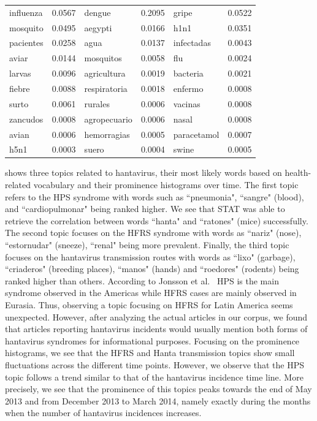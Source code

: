 \documentclass[conference]{IEEEtran}
\newcommand{\model}{{STAT}\xspace} %
\begin{document}
\begin{table}[t]
\begin{center}
\begin{tabular}{|lr|lr|lr|}
influenza & 0.0567 & dengue & 0.2095 & gripe & 0.0522 \\
mosquito & 0.0495 & aegypti & 0.0166 & h1n1 & 0.0351 \\
pacientes & 0.0258 & agua & 0.0137  & infectadas &0.0043 \\
aviar & 0.0144 & mosquitos & 0.0058  & flu & 0.0024\\
larvas & 0.0096 & agricultura & 0.0019 & bacteria & 0.0021 \\
fiebre & 0.0088 & respiratoria & 0.0018 & enfermo & 0.0008 \\
surto & 0.0061 & rurales & 0.0006 & vacinas & 0.0008 \\
zancudos & 0.0008 & agropecuario	 & 0.0006 & nasal & 0.0008 \\
avian & 0.0006 & hemorragias & 0.0005 & paracetamol & 0.0007 \\
h5n1 & 0.0003 & suero & 0.0004 & swine & 0.0005 \\
\hline
\end{tabular}\label{tab:common_topics}
\end{center}
\end{table}


 shows three topics related to hantavirus, their most likely words based on health-related vocabulary and their prominence histograms over time. 
The first topic refers to the HPS syndrome with words such as ``pneumonia", ``sangre" (blood), and ``cardiopulmonar" being ranked higher. We see that \model was able to retrieve the correlation between words ``hanta" and ``ratones" (mice) successfully. The second topic focuses on the HFRS syndrome with words as  ``nariz" (nose), ``estornudar" (sneeze), ``renal" being more prevalent. Finally, the third topic focuses on the hantavirus transmission routes with words as ``lixo" (garbage), ``criaderos" (breeding places), ``manos" (hands) and ``roedores" (rodents) being ranked higher than others. According to Jonsson et al.~\cite{jonsson:10} HPS is the main syndrome observed in the Americas while HFRS cases are mainly observed in Eurasia. Thus, observing a topic focusing on HFRS for Latin America seems unexpected. However, after analyzing the actual articles in our corpus, we found that articles reporting hantavirus incidents would usually mention both forms of hantavirus syndromes for informational purposes. Focusing on the prominence histograms, we see that the HFRS and Hanta transmission topics show small fluctuations across the different time points. However, we observe that the HPS topic follows a trend similar to that of the hantavirus incidence time line. More precisely, we see that the prominence of this topics peaks towards the end of May 2013 and from December 2013 to March 2014, namely exactly during the months when the number of hantavirus incidences increases.
\end{document}
